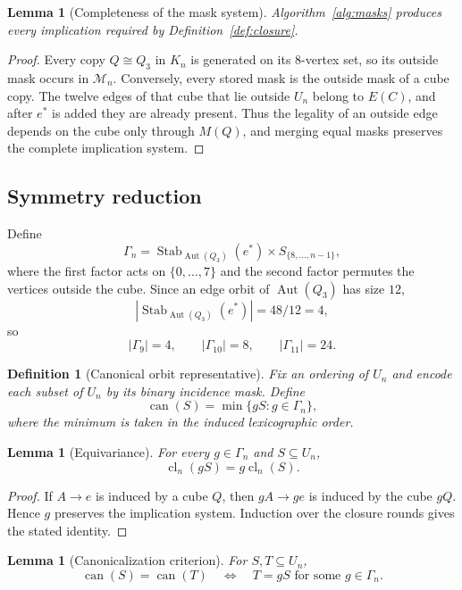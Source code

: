 \documentclass[11pt]{article}
\numberwithin{equation}{section}
\newtheorem{lemma}[theorem]{Lemma}
\newtheorem{definition}[theorem]{Definition}
\newcommand{\cl}{\operatorname{cl}}
\newcommand{\Aut}{\operatorname{Aut}}
\newcommand{\Stab}{\operatorname{Stab}}
\begin{document}
\begin{lemma}[Completeness of the mask system]\label{lem:masks}
Algorithm~\ref{alg:masks} produces every implication required by
Definition~\ref{def:closure}.
\end{lemma}

\begin{proof}
Every copy $Q\cong Q_3$ in $K_n$ is generated on its $8$-vertex set, so its
outside mask occurs in $\mathcal M_n$. Conversely, every stored mask is the
outside mask of a cube copy. The twelve edges of that cube that lie outside
$U_n$ belong to $E(C)$, and after $e^*$ is added they are already present.
Thus the legality of an outside edge depends on the cube only through
$M(Q)$, and merging equal masks preserves the complete implication system.
\end{proof}

\subsection{Symmetry reduction}
Define
\[
\Gamma_n=
\Stab_{\Aut(Q_3)}(e^*)\times S_{\{8,\ldots,n-1\}},
\tag{3.4}
\]
where the first factor acts on $\{0,\ldots,7\}$ and the second factor permutes the vertices outside the cube. Since an edge orbit of $\Aut(Q_3)$ has size $12$,
\[
|\Stab_{\Aut(Q_3)}(e^*)|=48/12=4,
\]
so
\[
|\Gamma_9|=4,\qquad |\Gamma_{10}|=8,\qquad |\Gamma_{11}|=24.
\tag{3.5}
\]

\begin{definition}[Canonical orbit representative]\label{def:can}
Fix an ordering of $U_n$ and encode each subset of $U_n$ by its binary incidence
mask. Define
\[
\operatorname{can}(S)=\min\{gS:g\in\Gamma_n\},
\tag{3.8}
\]
where the minimum is taken in the induced lexicographic order.
\end{definition}

\begin{lemma}[Equivariance]\label{lem:equiv}
For every $g\in\Gamma_n$ and $S\subseteq U_n$,
\[
\cl_n(gS)=g\cl_n(S).
\]
\end{lemma}

\begin{proof}
If $A\to e$ is induced by a cube $Q$, then $gA\to ge$ is induced by the
cube $gQ$. Hence $g$ preserves the implication system. Induction over the
closure rounds gives the stated identity.
\end{proof}

\begin{lemma}[Canonicalization criterion]\label{lem:can}
For $S,T\subseteq U_n$,
\[
\operatorname{can}(S)=\operatorname{can}(T)
\quad\Longleftrightarrow\quad
T=gS\text{ for some }g\in\Gamma_n.
\]
\end{lemma}
\end{document}
